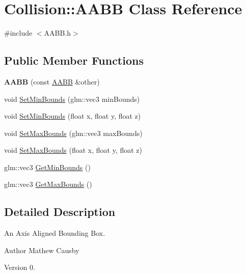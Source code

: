 \hypertarget{class_collision_1_1_a_a_b_b}{}\section{Collision\+:\+:A\+A\+BB Class Reference}
\label{class_collision_1_1_a_a_b_b}


{\ttfamily \#include $<$A\+A\+B\+B.\+h$>$}

\subsection*{Public Member Functions}
\begin{DoxyCompactItemize}
\item 
\mbox{\label{class_collision_1_1_a_a_b_b_aa68eab372bdbba7e4752d42fa4166d1f}} 
{\bfseries A\+A\+BB} (const \hyperlink{class_collision_1_1_a_a_b_b}{A\+A\+BB} \&other)
\item 
void \hyperlink{class_collision_1_1_a_a_b_b_a863ba998549280e4eada0916abc7c958}{Set\+Min\+Bounds} (glm\+::vec3 min\+Bounds)
\item 
void \hyperlink{class_collision_1_1_a_a_b_b_a4ef21c9f5d611f52c946b0b3c92712e2}{Set\+Min\+Bounds} (float x, float y, float z)
\item 
void \hyperlink{class_collision_1_1_a_a_b_b_a5fae8760f90ffd4f7bf6ce5f0903d7a0}{Set\+Max\+Bounds} (glm\+::vec3 max\+Bounds)
\item 
void \hyperlink{class_collision_1_1_a_a_b_b_a6ce73a9cb95d8d5d8ab19c625be032cd}{Set\+Max\+Bounds} (float x, float y, float z)
\item 
glm\+::vec3 \hyperlink{class_collision_1_1_a_a_b_b_a4fb67a336a9dccc1e5df1742e5215a82}{Get\+Min\+Bounds} ()
\item 
glm\+::vec3 \hyperlink{class_collision_1_1_a_a_b_b_a63411027d9f8b4300657afdeaa11f477}{Get\+Max\+Bounds} ()
\end{DoxyCompactItemize}


\subsection{Detailed Description}
An Axis Aligned Bounding Box. \begin{DoxyAuthor}{Author}
Mathew Causby 
\end{DoxyAuthor}
\begin{DoxyVersion}{Version}
0. 
\end{DoxyVersion}



